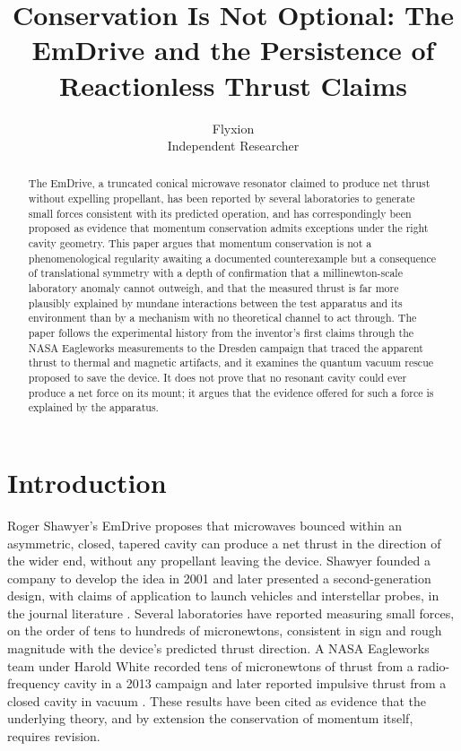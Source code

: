 \documentclass[11pt]{article}
\title{Conservation Is Not Optional: The EmDrive and the Persistence of Reactionless Thrust Claims}
\author{Flyxion \\ \small Independent Researcher}
\date{}
\begin{document}
\maketitle

\begin{abstract}
The EmDrive, a truncated conical microwave resonator claimed to produce net thrust without expelling propellant, has been reported by several laboratories to generate small forces consistent with its predicted operation, and has correspondingly been proposed as evidence that momentum conservation admits exceptions under the right cavity geometry. This paper argues that momentum conservation is not a phenomenological regularity awaiting a documented counterexample but a consequence of translational symmetry with a depth of confirmation that a millinewton-scale laboratory anomaly cannot outweigh, and that the measured thrust is far more plausibly explained by mundane interactions between the test apparatus and its environment than by a mechanism with no theoretical channel to act through. The paper follows the experimental history from the inventor's first claims through the NASA Eagleworks measurements to the Dresden campaign that traced the apparent thrust to thermal and magnetic artifacts, and it examines the quantum vacuum rescue proposed to save the device. It does not prove that no resonant cavity could ever produce a net force on its mount; it argues that the evidence offered for such a force is explained by the apparatus.
\end{abstract}

\section{Introduction}

Roger Shawyer's EmDrive proposes that microwaves bounced within an asymmetric, closed, tapered cavity can produce a net thrust in the direction of the wider end, without any propellant leaving the device. Shawyer founded a company to develop the idea in 2001 and later presented a second-generation design, with claims of application to launch vehicles and interstellar probes, in the journal literature \cite{S2015}. Several laboratories have reported measuring small forces, on the order of tens to hundreds of micronewtons, consistent in sign and rough magnitude with the device's predicted thrust direction. A NASA Eagleworks team under Harold White recorded tens of micronewtons of thrust from a radio-frequency cavity in a 2013 campaign and later reported impulsive thrust from a closed cavity in vacuum \cite{B2014,W2017}. These results have been cited as evidence that the underlying theory, and by extension the conservation of momentum itself, requires revision.
\end{document}
